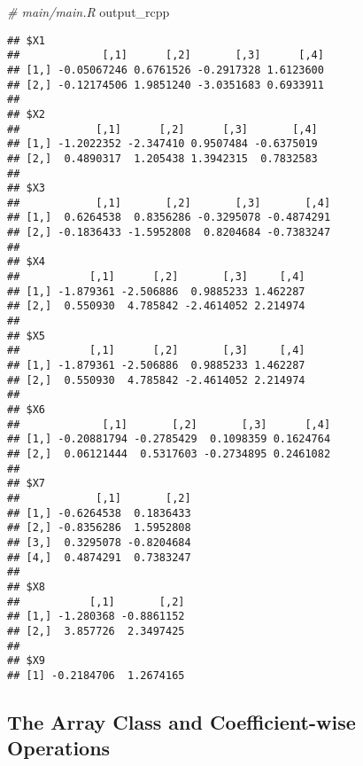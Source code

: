 \documentclass[
]{book}
\newenvironment{Shaded}{\begin{snugshade}}{\end{snugshade}}
\newcommand{\CommentTok}[1]{\textcolor[rgb]{0.56,0.35,0.01}{\textit{#1}}}
\newcommand{\NormalTok}[1]{#1}
\begin{document}
\begin{Shaded}
\begin{Highlighting}[]
\CommentTok{# main/main.R}
\NormalTok{output_rcpp}
\end{Highlighting}
\end{Shaded}

\begin{verbatim}
## $X1
##             [,1]      [,2]       [,3]      [,4]
## [1,] -0.05067246 0.6761526 -0.2917328 1.6123600
## [2,] -0.12174506 1.9851240 -3.0351683 0.6933911
## 
## $X2
##            [,1]      [,2]      [,3]       [,4]
## [1,] -1.2022352 -2.347410 0.9507484 -0.6375019
## [2,]  0.4890317  1.205438 1.3942315  0.7832583
## 
## $X3
##            [,1]       [,2]       [,3]       [,4]
## [1,]  0.6264538  0.8356286 -0.3295078 -0.4874291
## [2,] -0.1836433 -1.5952808  0.8204684 -0.7383247
## 
## $X4
##           [,1]      [,2]       [,3]     [,4]
## [1,] -1.879361 -2.506886  0.9885233 1.462287
## [2,]  0.550930  4.785842 -2.4614052 2.214974
## 
## $X5
##           [,1]      [,2]       [,3]     [,4]
## [1,] -1.879361 -2.506886  0.9885233 1.462287
## [2,]  0.550930  4.785842 -2.4614052 2.214974
## 
## $X6
##             [,1]       [,2]       [,3]      [,4]
## [1,] -0.20881794 -0.2785429  0.1098359 0.1624764
## [2,]  0.06121444  0.5317603 -0.2734895 0.2461082
## 
## $X7
##            [,1]       [,2]
## [1,] -0.6264538  0.1836433
## [2,] -0.8356286  1.5952808
## [3,]  0.3295078 -0.8204684
## [4,]  0.4874291  0.7383247
## 
## $X8
##           [,1]       [,2]
## [1,] -1.280368 -0.8861152
## [2,]  3.857726  2.3497425
## 
## $X9
## [1] -0.2184706  1.2674165
\end{verbatim}

\hypertarget{the-array-class-and-coefficient-wise-operations}{%
\subsection{The Array Class and Coefficient-wise Operations}\label{the-array-class-and-coefficient-wise-operations}}
\end{document}
